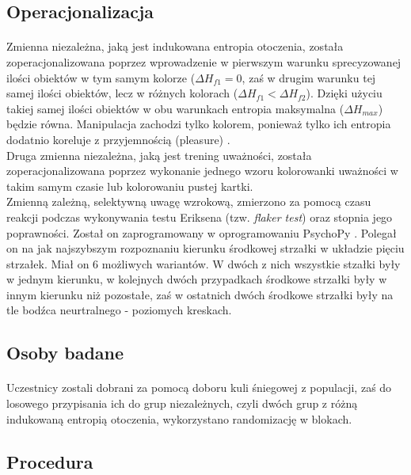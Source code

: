 \documentclass[12pt,a4paper,final,oneside,onecolumn,titlepage]{article}
\begin{document}
\subsection*{\normalsize{\textbf{Operacjonalizacja}}}
\paragraph{}
Zmienna niezależna, jaką jest indukowana entropia otoczenia, została zoperacjonalizowana poprzez wprowadzenie w pierwszym warunku sprecyzowanej ilości obiektów w tym samym kolorze ($\Delta H_{f1}=0$, zaś w drugim warunku tej samej ilości obiektów, lecz w różnych kolorach ($\Delta H_{f1}<\Delta H_{f2}$). Dzięki użyciu takiej samej ilości obiektów w obu warunkach entropia maksymalna ($\Delta H_{max}$) będzie równa. Manipulacja zachodzi tylko kolorem, ponieważ tylko ich entropia dodatnio koreluje z przyjemnością (pleasure) \citep{stamps_entropy_2004, stamps_entropy_2002}.\\
Druga zmienna niezależna, jaką jest trening uważności, została zoperacjonalizowana poprzez wykonanie jednego wzoru kolorowanki uważności w takim samym czasie lub kolorowaniu pustej kartki.\\
Zmienną zależną, selektywną uwagę wzrokową, zmierzono za pomocą czasu reakcji podczas wykonywania testu Eriksena (tzw. \textit{flaker test}) oraz stopnia jego poprawności. Został on zaprogramowany w oprogramowaniu PsychoPy \citep{peirce_psychopy2_2019}. Polegał on na jak najszybszym rozpoznaniu kierunku środkowej strzałki w układzie pięciu strzałek. Miał on 6 możliwych wariantów. W dwóch z nich wszystkie stzałki były w jednym kierunku, w kolejnych dwóch przypadkach środkowe strzałki były w innym kierunku niż pozostałe, zaś w ostatnich dwóch środkowe strzałki były na tle bodźca neurtralnego - poziomych kreskach.
\subsection*{\normalsize{\textbf{Osoby badane}}}
\paragraph{}
Uczestnicy zostali dobrani za pomocą doboru kuli śniegowej z populacji, zaś do losowego przypisania ich do grup niezależnych, czyli dwóch grup z różną indukowaną entropią otoczenia, wykorzystano randomizację w blokach.
\subsection*{\normalsize{\textbf{Procedura}}}
\end{document}
